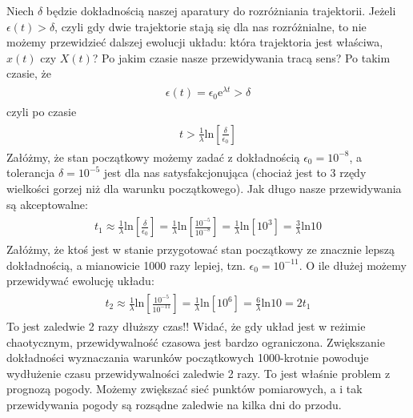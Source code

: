 \documentclass[a4paper,12pt,polish]{sphinxmanual}
\begin{document}
Niech $\delta$ będzie dokładnością naszej aparatury do rozróżniania trajektorii.  Jeżeli $\epsilon(t) > \delta$, czyli gdy dwie  trajektorie stają się dla nas rozróżnialne, to nie możemy przewidzieć dalszej ewolucji układu:  która trajektoria jest właściwa, $x(t)$ czy $X(t)$? Po jakim czasie nasze przewidywania tracą sens?  Po takim czasie, że
\label{ch2/chII012:equation-eqn4}\begin{gather}
\begin{split}\epsilon(t) = \epsilon_0  \mbox{e}^{\lambda t} > \delta\end{split}\label{ch2/chII012-eqn4}
\end{gather}
czyli po czasie
\label{ch2/chII012:equation-eqn5}\begin{gather}
\begin{split} t > \frac{1}{\lambda}  \mbox{ln} \left[\frac{\delta}{\epsilon_0}\right]\end{split}\label{ch2/chII012-eqn5}
\end{gather}
Załóżmy, że stan początkowy możemy  zadać z dokładnością $\epsilon_0 = 10^{-8}$, a tolerancja $\delta = 10^{-5}$ jest dla nas satysfakcjonująca (chociaż jest to 3 rzędy wielkości gorzej niż dla warunku początkowego).  Jak długo nasze przewidywania  są akceptowalne:
\label{ch2/chII012:equation-eqn6}\begin{gather}
\begin{split} t_1  \approx  \frac{1}{\lambda}  \mbox{ln} \left[\frac{\delta}{\epsilon_0}\right]  =  \frac{1}{\lambda}  \mbox{ln} \left[\frac{10^{-5}}{10^{-8}}\right]  = \frac{1}{\lambda}  \mbox{ln} \left[10^3\right] =  \frac{3}{\lambda}  \mbox{ln} 10\end{split}\label{ch2/chII012-eqn6}
\end{gather}
Załóżmy,  że ktoś jest w stanie przygotować  stan początkowy  ze znacznie lepszą dokładnością, a mianowicie 1000 razy lepiej, tzn.  $\epsilon_0 = 10^{-11}$.  O ile dłużej możemy przewidywać ewolucję układu:
\label{ch2/chII012:equation-eqn7}\begin{gather}
\begin{split} t_2  \approx    \frac{1}{\lambda}  \mbox{ln} \left[\frac{10^{-5}}{10^{-11}}\right]  = \frac{1}{\lambda}  \mbox{ln} \left[10^6\right] =  \frac{6}{\lambda}  \mbox{ln} 10  = 2 t_1\end{split}\label{ch2/chII012-eqn7}
\end{gather}
To jest zaledwie 2 razy dłuższy czas!! Widać, że gdy układ jest w reżimie chaotycznym, przewidywalność czasowa jest bardzo ograniczona. Zwiększanie dokładności wyznaczania warunków początkowych  1000-krotnie powoduje wydłużenie  czasu przewidywalności  zaledwie 2 razy. To jest właśnie problem  z prognozą pogody. Możemy zwiększać sieć punktów pomiarowych, a i tak przewidywania pogody są  rozsądne  zaledwie  na kilka dni do przodu.
\end{document}
